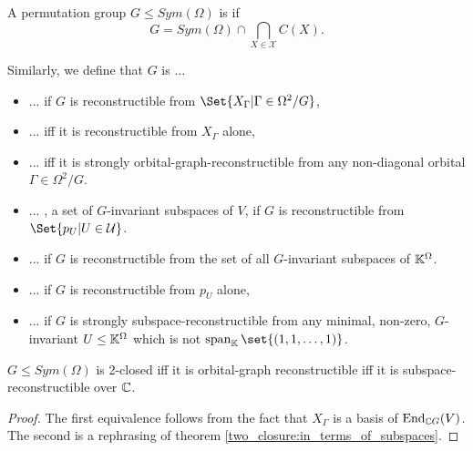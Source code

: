 \documentclass[fontsize=11pt,fleqn,a4paper]{scrartcl}
\begin{document}
\begin{definition}
A permutation group $G\leq Sym(\Omega)$ is  if
\[G = Sym(\Omega) \cap \bigcap_{X\in\mathcal{X}} C(X).\]

Similarly, we define that $G$ is ...
\begin{itemize}
\item ...  if $G$ is reconstructible from $\Set{X_\Gamma | \Gamma\in\Omega^2/G}$,
\item ...  iff it is reconstructible from $X_\Gamma$ alone,
\item ...  iff it is strongly orbital-graph-reconstructible from any non-diagonal orbital $\Gamma\in\Omega^2/G$.
\item ... , a set of $G$-invariant subspaces of $V$, if $G$ is reconstructible from $\Set{p_U | U\in\mathcal{U}}$.
\item ...  if $G$ is reconstructible from the set of all $G$-invariant subspaces of $\mathbb{K}^\Omega$.
\item ...  if $G$ is reconstructible from $p_U$ alone,
\item ...  if $G$ is strongly subspace-reconstructible from any minimal, non-zero, $G$-invariant $U\leq\mathbb{K}^\Omega$ which is not $\LinHull_\IK\set{(1,1,\ldots,1)}$.
\end{itemize}
\end{definition}

\begin{corollary}
$G\leq Sym(\Omega)$ is 2-closed iff it is orbital-graph reconstructible iff it is subspace-reconstructible over $\mathbb{C}$.
\end{corollary}
\begin{proof}
The first equivalence follows from the fact that $X_\Gamma$ is a basis of $\operatorname{End}_{\mathbb{C} G}(V)$. The second is a rephrasing of theorem \ref{two_closure:in_terms_of_subspaces}.
\end{proof}
\end{document}
